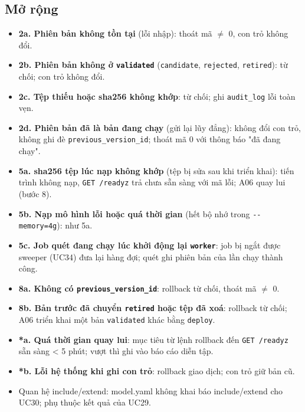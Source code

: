 \subsection{Mở rộng}
\begin{itemize}
\item \textbf{2a. Phiên bản không tồn tại} (lỗi nhập): thoát mã \ensuremath{\neq} 0, con trỏ không đổi.
\item \textbf{2b. Phiên bản không ở {\small\texttt{validated}}} ({\small\texttt{candidate}}, {\small\texttt{rejected}}, {\small\texttt{retired}}): từ chối; con trỏ không đổi.
\item \textbf{2c. Tệp thiếu hoặc sha256 không khớp}: từ chối; ghi {\small\texttt{audit\_\allowbreak{}\allowbreak{}log}} lỗi toàn vẹn.
\item \textbf{2d. Phiên bản đã là bản đang chạy} (gửi lại lũy đẳng): không đổi con trỏ, không ghi đè {\small\texttt{previous\_\allowbreak{}\allowbreak{}version\_\allowbreak{}\allowbreak{}id}}; thoát mã 0 với thông báo "đã đang chạy".
\item \textbf{5a. sha256 tệp lúc nạp không khớp} (tệp bị sửa sau khi triển khai): tiến trình không nạp, {\small\texttt{GET /\allowbreak{}\allowbreak{}readyz}} trả chưa sẵn sàng với mã lỗi; A06 quay lui (bước 8).
\item \textbf{5b. Nạp mô hình lỗi hoặc quá thời gian} (hết bộ nhớ trong {\small\texttt{-\allowbreak{}-\allowbreak{}memory=4g}}): như 5a.
\item \textbf{5c. Job quét đang chạy lúc khởi động lại {\small\texttt{worker}}}: job bị ngắt được sweeper (UC34) đưa lại hàng đợi; quét ghi phiên bản của lần chạy thành công.
\item \textbf{8a. Không có {\small\texttt{previous\_\allowbreak{}\allowbreak{}version\_\allowbreak{}\allowbreak{}id}}}: rollback từ chối, thoát mã \ensuremath{\neq} 0.
\item \textbf{8b. Bản trước đã chuyển {\small\texttt{retired}} hoặc tệp đã xoá}: rollback từ chối; A06 triển khai một bản {\small\texttt{validated}} khác bằng {\small\texttt{deploy}}.
\item \textbf{*a. Quá thời gian quay lui}: mục tiêu từ lệnh rollback đến {\small\texttt{GET /\allowbreak{}\allowbreak{}readyz}} sẵn sàng < 5 phút; vượt thì ghi vào báo cáo diễn tập.
\item \textbf{*b. Lỗi hệ thống khi ghi con trỏ}: rollback giao dịch; con trỏ giữ bản cũ.
\item Quan hệ include/\allowbreak{}extend: model.yaml không khai báo include/\allowbreak{}extend cho UC30; phụ thuộc kết quả của UC29.
\end{itemize}
